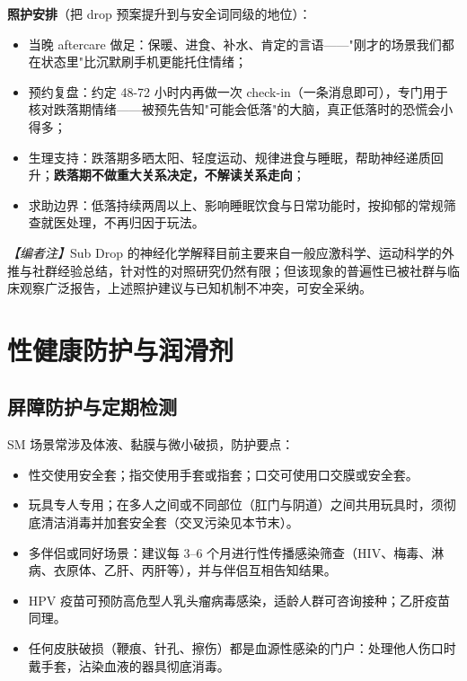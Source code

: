 \documentclass[12pt,UTF8]{ctexbook}
\begin{document}
\textbf{照护安排}（把 drop 预案提升到与安全词同级的地位）：
\begin{itemize}
\item 当晚 aftercare 做足：保暖、进食、补水、肯定的言语——"刚才的场景我们都在状态里"比沉默刷手机更能托住情绪；
\item 预约复盘：约定 48-72 小时内再做一次 check-in（一条消息即可），专门用于核对跌落期情绪——被预先告知"可能会低落"的大脑，真正低落时的恐慌会小得多；
\item 生理支持：跌落期多晒太阳、轻度运动、规律进食与睡眠，帮助神经递质回升；\textbf{跌落期不做重大关系决定，不解读关系走向}；
\item 求助边界：低落持续两周以上、影响睡眠饮食与日常功能时，按抑郁的常规筛查就医处理，不再归因于玩法。
\end{itemize}

\noindent\textit{【编者注】}Sub Drop 的神经化学解释目前主要来自一般应激科学、运动科学的外推\citep{sagarin2009}与社群经验总结，针对性的对照研究仍然有限；但该现象的普遍性已被社群与临床观察广泛报告，上述照护建议与已知机制不冲突，可安全采纳。

\section{性健康防护与润滑剂}\label{sec:sexualhealth}

\subsection{屏障防护与定期检测}

SM 场景常涉及体液、黏膜与微小破损，防护要点：

\begin{itemize}
\item 性交使用安全套；指交使用手套或指套；口交可使用口交膜或安全套。
\item 玩具专人专用；在多人之间或不同部位（肛门与阴道）之间共用玩具时，须彻底清洁消毒并加套安全套（交叉污染见本节末）。
\item 多伴侣或同好场景：建议每 3--6 个月进行性传播感染筛查（HIV、梅毒、淋病、衣原体、乙肝、丙肝等），并与伴侣互相告知结果。
\item HPV 疫苗可预防高危型人乳头瘤病毒感染，适龄人群可咨询接种；乙肝疫苗同理。
\item 任何皮肤破损（鞭痕、针孔、擦伤）都是血源性感染的门户：处理他人伤口时戴手套，沾染血液的器具彻底消毒。
\end{itemize}
\end{document}
